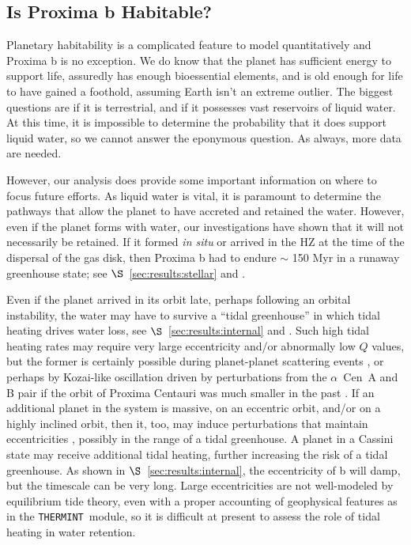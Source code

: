 \documentclass[preprint,12pt]{aastex}
\def\acen{{$\alpha$~Cen}}
\def\thermint{\texttt{\footnotesize{THERMINT}}\xspace}
\begin{document}
\subsection{Is Proxima b Habitable?}
\label{sec:results:habitable}

Planetary habitability is a complicated feature to model
quantitatively and Proxima b is no exception. We do know that the
planet has sufficient energy to support life, assuredly has enough
bioessential elements, and is old enough for life to have gained a
foothold, assuming Earth isn't an extreme outlier. The biggest
questions are if it is terrestrial, and if it possesses vast reservoirs
of liquid water. At this time, it is impossible to determine the
probability that it does support liquid water, so we cannot answer the
eponymous question. As always, more data are needed.

However, our analysis does provide some important information on where
to focus future efforts. As liquid water is vital, it is paramount to
determine the pathways that allow the planet to have accreted and
retained the water. However, even if the planet forms with water, our
investigations have shown that it will not necessarily be retained. If
it formed {\it in situ} or arrived in the HZ at the time of the
dispersal of the gas disk, then Proxima b had to endure $\sim$ 150
Myr in a runaway greenhouse state; see $\S$~\ref{sec:results:stellar} and
\cite{LugerBarnes15}.

Even if the planet arrived in its orbit late, perhaps following an
orbital instability, the water may have to survive a ``tidal
greenhouse'' in which tidal heating drives water loss, see
$\S$~\ref{sec:results:internal} and \cite{Barnes13}. Such high tidal
heating rates may require very large eccentricity and/or abnormally
low $Q$ values, but the former is certainly possible during
planet-planet scattering events \citep{Chatterjee08}, or perhaps by
Kozai-like oscillation driven by perturbations from the \acen~A and B
pair if the orbit of Proxima Centauri was much smaller in the past
\citep{DesideraBarbieri07}. If an additional planet in the system is
massive, on an eccentric orbit, and/or on a highly inclined orbit,
then it, too, may induce perturbations that maintain eccentricities
\citep{TakedaRasio05}, possibly in the range of a tidal greenhouse. A
planet in a Cassini state may receive additional tidal heating,
further increasing the risk of a tidal greenhouse. As shown in
$\S$~\ref{sec:results:internal}, the eccentricity of b will damp, but
the timescale can be very long. Large eccentricities are not
well-modeled by equilibrium tide theory, even with a proper accounting
of geophysical features as in the \thermint~module, so it is difficult
at present to assess the role of tidal heating in water retention.
\end{document}
